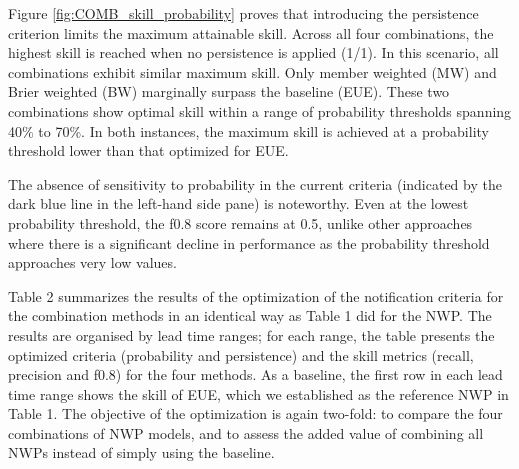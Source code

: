 \documentclass[preprint,12pt]{elsarticle}
\begin{document}
Figure \ref{fig:COMB_skill_probability} proves that introducing the persistence criterion limits the maximum attainable skill. Across all four combinations, the highest skill is reached when no persistence is applied (1/1). In this scenario, all combinations exhibit similar maximum skill. Only member weighted (MW) and Brier weighted  (BW) marginally surpass the baseline (EUE). These two combinations show optimal skill within a range of probability thresholds spanning 40\% to 70\%. In both instances, the maximum skill is achieved at a probability threshold lower than that optimized for EUE.

The absence of sensitivity to probability in the current criteria (indicated by the dark blue line in the left-hand side pane) is noteworthy. Even at the lowest probability threshold, the f0.8 score remains at 0.5, unlike other approaches where there is a significant decline in performance as the probability threshold approaches very low values.

Table 2 summarizes the results of the optimization of the notification criteria for the combination methods in an identical way as Table 1 did for the NWP. The results are organised by lead time ranges; for each range, the table presents the optimized criteria (probability and persistence) and the skill metrics (recall, precision and f0.8) for the four methods. As a baseline, the first row in each lead time range shows the skill of EUE, which we established as the reference NWP in Table 1. The objective of the optimization is again two-fold: to compare the four combinations of NWP models, and to assess the added value of combining all NWPs instead of simply using the baseline. 
\end{document}
